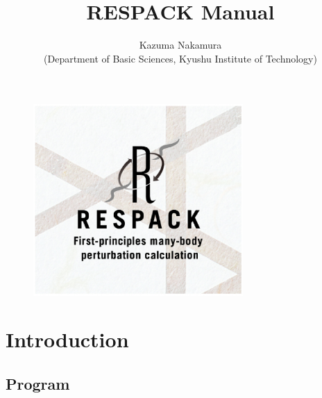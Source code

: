 \documentclass{article}
\title{\huge RESPACK Manual}
\author{\Large Kazuma Nakamura \\ (Department of Basic Sciences,
Kyushu Institute of Technology)}
\begin{document}
\maketitle
\begin{figure}[h] 
\centering
\includegraphics[width=8cm]{respack.eps}
\label{title}
\end{figure}

\clearpage 

\tableofcontents

\clearpage 

\section{Introduction}

\subsection{Program}
\end{document}
